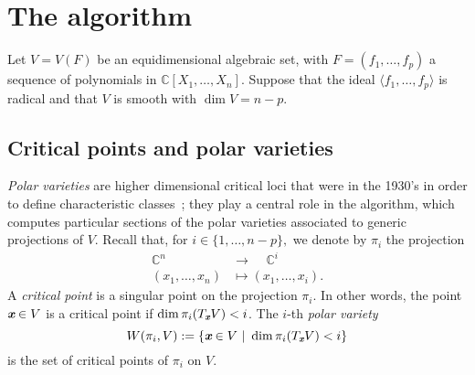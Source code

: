 \documentclass[a4paper]{article}
\def\xb{\textit{\textbf{x}}}
\def\C{\mathbb{C}}
\def\Wi{W(\pi_i,V)}
\begin{document}
\section{The algorithm}
Let $V=V(F)$ be an equidimensional algebraic set, with $F = (f_1,\hdots,f_p)$ a sequence of polynomials in  $\C[X_1,\hdots,X_n]$. Suppose that the ideal $\langle f_1,\hdots, f_p \rangle $ is radical and that $V$ is smooth with $\dim V = n-p$. 

\subsection{Critical points and polar varieties} 
{\em Polar varieties} are higher dimensional critical loci that were in the 1930's in order to define characteristic
classes~\cite{Piene78,Teissier88}; they play a central role in the algorithm, which computes particular sections of the
polar varieties associated to generic projections of $V$. Recall that, for $i \in
\{1,\hdots,n-p\},$ we denote by $\pi_i$ the projection 
%
\begin{align*}
\C^n~~~~~ &\rightarrow~~~~~ \C^i \\
(x_1,\hdots,x_n) &\mapsto  (x_1,\hdots,x_i).    
\end{align*} 
%
A \textit{critical point} is a singular point on the projection $\pi_i.$ In other words, the point $\xb \in V$ is a critical point if $\dim \pi_i( T_{\xb}V) < i$.
The $i$-th
\textit{polar variety} 
\[
\Wi := \left\{\xb \in V~|~\dim \pi_i(T_\xb
V) < i\right\}
\]
is the set of critical points of $\pi_i$ on $V$. 
%


\end{document}
